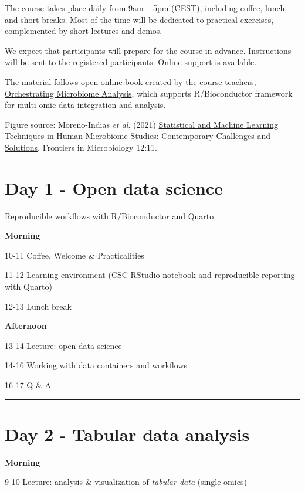 \documentclass[
  oneside]{book}
\begin{document}
The course takes place daily from 9am -- 5pm (CEST), including coffee,
lunch, and short breaks. Most of the time will be dedicated to
practical exercises, complemented by short lectures and demos.

We expect that participants will prepare for the course in advance.
Instructions will be sent to the registered participants. Online
support is available.

The material follows open online book created by the course teachers,
\href{https://microbiome.github.io/OMA}{Orchestrating Microbiome Analysis},
which supports R/Bioconductor framework for multi-omic data
integration and analysis.

Figure source: Moreno-Indias \emph{et al}. (2021) \href{https://doi.org/10.3389/fmicb.2021.635781}{Statistical and Machine Learning Techniques in Human Microbiome Studies: Contemporary Challenges and Solutions}. Frontiers in Microbiology 12:11.

\hypertarget{day-1---open-data-science}{%
\section{Day 1 - Open data science}\label{day-1---open-data-science}}

Reproducible workflows with R/Bioconductor and Quarto

\textbf{Morning}

10-11 Coffee, Welcome \& Practicalities

11-12 Learning environment (CSC RStudio notebook and reproducible reporting with Quarto)

12-13 Lunch break

\textbf{Afternoon}

13-14 Lecture: open data science

14-16 Working with data containers and workflows

16-17 Q \& A

\begin{center}\rule{0.5\linewidth}{0.5pt}\end{center}

\hypertarget{day-2---tabular-data-analysis}{%
\section{Day 2 - Tabular data analysis}\label{day-2---tabular-data-analysis}}

\textbf{Morning}

9-10 Lecture: analysis \& visualization of \emph{tabular data} (single omics)
\end{document}
